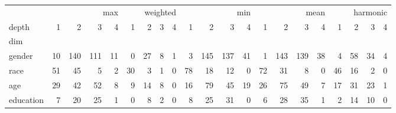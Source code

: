 \begin{tabular}{lrrrrrrrrrrrrrrrrrrrr}
\toprule
 & \multicolumn{4}{r}{max} & \multicolumn{4}{r}{weighted} & \multicolumn{4}{r}{min} & \multicolumn{4}{r}{mean} & \multicolumn{4}{r}{harmonic} \\
depth & 1 & 2 & 3 & 4 & 1 & 2 & 3 & 4 & 1 & 2 & 3 & 4 & 1 & 2 & 3 & 4 & 1 & 2 & 3 & 4 \\
dim &  &  &  &  &  &  &  &  &  &  &  &  &  &  &  &  &  &  &  &  \\
\midrule
gender & 10 & 140 & 111 & 11 & 0 & 27 & 8 & 1 & 3 & 145 & 137 & 41 & 1 & 143 & 139 & 38 & 4 & 58 & 34 & 4 \\
race & 51 & 45 & 5 & 2 & 30 & 3 & 1 & 0 & 78 & 18 & 12 & 0 & 72 & 31 & 8 & 0 & 46 & 16 & 2 & 0 \\
age & 29 & 42 & 52 & 8 & 9 & 14 & 8 & 0 & 16 & 79 & 45 & 19 & 26 & 75 & 49 & 7 & 17 & 31 & 23 & 1 \\
education & 7 & 20 & 25 & 1 & 0 & 8 & 2 & 0 & 8 & 25 & 31 & 0 & 6 & 28 & 35 & 1 & 2 & 14 & 10 & 0 \\
\bottomrule
\end{tabular}
